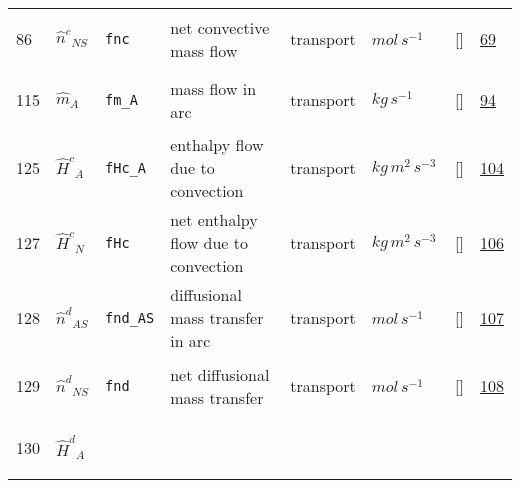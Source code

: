 \begin{longtable}{|p{1cm}|p{3cm}|p{3cm}|p{7cm}|p{3.0cm}|p{3cm}|p{2cm}|p{1cm}|}
    86
             & \hypertarget{"v:86"}{ $ {\hat{n}^{c}}{_{{N S}}} $}
             & \verb|fnc|
             & net convective mass flow
             & \begin{lay}transport \end{lay}
             & $ mol \,s^{-1} \, $
             & []
             & \hyperlink{"e:69"}{ 69 }
                 \\
    115
             & \hypertarget{"v:115"}{ $ {\hat{m}}{_{A}} $}
             & \verb|fm_A|
             & mass flow in arc
             & \begin{lay}transport \end{lay}
             & $ kg \,s^{-1} \, $
             & []
             & \hyperlink{"e:94"}{ 94 }
                 \\
    125
             & \hypertarget{"v:125"}{ $ {\hat{H}^{c}}{_{A}} $}
             & \verb|fHc_A|
             & enthalpy flow due to convection
             & \begin{lay}transport \end{lay}
             & $ kg \,m^{2} \,s^{-3} \, $
             & []
             & \hyperlink{"e:104"}{ 104 }
                 \\
    127
             & \hypertarget{"v:127"}{ $ {\hat{H}^{c}}{_{N}} $}
             & \verb|fHc|
             & net enthalpy flow due to convection
             & \begin{lay}transport \end{lay}
             & $ kg \,m^{2} \,s^{-3} \, $
             & []
             & \hyperlink{"e:106"}{ 106 }
                 \\
    128
             & \hypertarget{"v:128"}{ $ {\hat{n}^{d}}{_{{A S}}} $}
             & \verb|fnd_AS|
             & diffusional mass transfer in arc
             & \begin{lay}transport \end{lay}
             & $ mol \,s^{-1} \, $
             & []
             & \hyperlink{"e:107"}{ 107 }
                 \\
    129
             & \hypertarget{"v:129"}{ $ {\hat{n}^{d}}{_{{N S}}} $}
             & \verb|fnd|
             & net diffusional mass transfer
             & \begin{lay}transport \end{lay}
             & $ mol \,s^{-1} \, $
             & []
             & \hyperlink{"e:108"}{ 108 }
                 \\
    130
             & \hypertarget{"v:130"}{ $ {\hat{H}^{d}}{_{A}} $}

\end{longtable}
